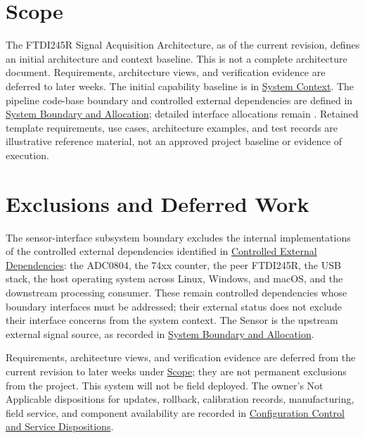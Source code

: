 \section{Scope}
\label{Section:ProjectScope}
The FTDI245R Signal Acquisition Architecture, as of the current revision, defines an initial architecture and context baseline. This is not a complete architecture document. Requirements, architecture views, and verification evidence are deferred to later weeks. The initial capability baseline is in
\hyperref[Section:InitialCapabilityBaseline]{System Context}. The pipeline code-base boundary and controlled external dependencies are
defined in \hyperref[Section:ProjectSystemBoundary]{System Boundary and Allocation};
detailed interface allocations remain \OwnedTBD{}. Retained template requirements,
use cases, architecture examples, and test records are illustrative reference
material, not an approved project baseline or evidence of execution.

\section{Exclusions and Deferred Work}
\label{Section:ProjectExclusions}
The sensor-interface subsystem boundary excludes the internal implementations
of the controlled external dependencies identified in
\hyperref[Table:ContextDependencies]{Controlled External Dependencies}:
the ADC0804, the 74xx counter, the peer FTDI245R, the USB stack, the host
operating system across Linux, Windows, and macOS, and the downstream
processing consumer. These remain controlled dependencies whose boundary
interfaces must be addressed; their external status does not exclude their
interface concerns from the system context. The Sensor is the upstream
external signal source, as recorded in
\hyperref[Section:ProjectSystemBoundary]{System Boundary and Allocation}.

Requirements, architecture views, and verification evidence are deferred
from the current revision to later weeks under
\hyperref[Section:ProjectScope]{Scope}; they are not permanent exclusions
from the project. This system will not be field deployed. The owner's
Not Applicable dispositions for updates, rollback, calibration records,
manufacturing, field service, and component availability are recorded in
\hyperref[Section:ProjectConfigurationControl]{Configuration Control and
Service Dispositions}.

